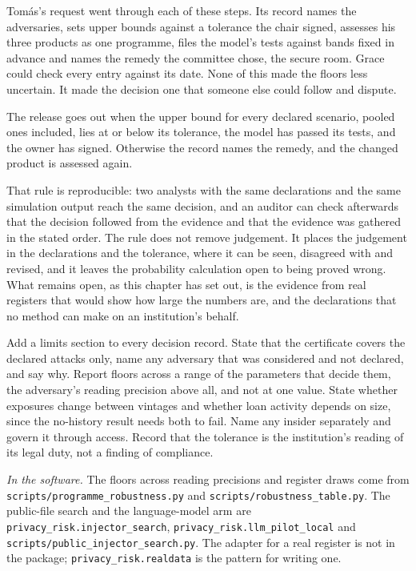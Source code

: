 Tom\'as's request went through each of these steps. Its record names the adversaries, sets
upper bounds against a tolerance the chair signed, assesses his three products as one
programme, files the model's tests against bands fixed in advance and names the remedy the
committee chose, the secure room. Grace could check every entry against its date. None of
this made the floors less uncertain. It made the decision one that someone else could
follow and dispute.

The release goes out when the upper bound for every declared scenario, pooled ones
included, lies at or below its tolerance, the model has passed its tests, and the
owner has signed. Otherwise the record names the remedy, and the changed product is
assessed again.

That rule is reproducible: two analysts with the same declarations and the same
simulation output reach the same decision, and an auditor can check afterwards that
the decision followed from the evidence and that the evidence was gathered in the
stated order. The rule does not remove judgement. It places the judgement in the
declarations and the tolerance, where it can be seen, disagreed with and revised, and
it leaves the probability calculation open to being proved wrong. What remains open,
as this chapter has set out, is the evidence from real registers that would show how
large the numbers are, and the declarations that no method can make on an
institution's behalf.

\begin{inpractice}
\setlength{\emergencystretch}{3em}%
Add a limits section to every decision record. State that the certificate covers the
declared attacks only, name any adversary that was considered and not declared, and
say why. Report floors across a range of the parameters that decide them, the
adversary's reading precision above all, and not at one value. State whether
exposures change between vintages and whether loan activity depends on size, since
the no-history result needs both to fail. Name any insider separately and govern it
through access. Record that the tolerance is the institution's reading of its legal
duty, not a finding of compliance.

\smallskip\noindent\textit{In the software.} The floors across reading precisions and
register draws come from \texttt{scripts/\allowbreak{}programme\_\allowbreak{}robustness.\allowbreak{}py} and
\texttt{scripts/\allowbreak{}robustness\_\allowbreak{}table.\allowbreak{}py}. The public-file search and the language-model
arm are \texttt{privacy\_\allowbreak{}risk.\allowbreak{}injector\_\allowbreak{}search},
\texttt{privacy\_\allowbreak{}risk.\allowbreak{}llm\_\allowbreak{}pilot\_\allowbreak{}local} and
\texttt{scripts/\allowbreak{}public\_\allowbreak{}injector\_\allowbreak{}search.\allowbreak{}py}. The adapter for a real register is not
in the package; \texttt{privacy\_\allowbreak{}risk.\allowbreak{}realdata} is the pattern for writing one.
\end{inpractice}

